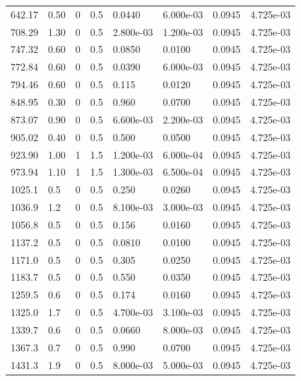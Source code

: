 \documentclass[preview]{standalone}
\begin{document}
{{\begin{tabular}{L{1.2cm}C{1.2cm} C{0.3cm}C{0.5cm} C{1.4cm}C{1.4cm} C{1.4cm}C{1.4cm}}
  642.17  &  0.50  & 0     & 0.5 &  0.0440  & 6.000e-03  & 0.0945 &  4.725e-03   \\ 
  708.29  &  1.30  & 0     & 0.5 &  2.800e-03  & 1.200e-03  & 0.0945 &  4.725e-03   \\ 
  747.32  &  0.60  & 0     & 0.5 &  0.0850  & 0.0100  & 0.0945 &  4.725e-03   \\ 
  772.84  &  0.60  & 0     & 0.5 &  0.0390  & 6.000e-03  & 0.0945 &  4.725e-03   \\ 
  794.46  &  0.60  & 0     & 0.5 &  0.115  & 0.0120  & 0.0945 &  4.725e-03   \\ 
  848.95  &  0.30  & 0     & 0.5 &  0.960  & 0.0700  & 0.0945 &  4.725e-03   \\ 
  873.07  &  0.90  & 0     & 0.5 &  6.600e-03  & 2.200e-03  & 0.0945 &  4.725e-03   \\ 
  905.02  &  0.40  & 0     & 0.5 &  0.500  & 0.0500  & 0.0945 &  4.725e-03   \\ 
  923.90  &  1.00  & 1     & 1.5 &  1.200e-03  & 6.000e-04  & 0.0945 &  4.725e-03   \\ 
  973.94  &  1.10  & 1     & 1.5 &  1.300e-03  & 6.500e-04  & 0.0945 &  4.725e-03   \\ 
  1025.1  &   0.5  & 0     & 0.5 &  0.250  & 0.0260  & 0.0945 &  4.725e-03   \\ 
  1036.9  &   1.2  & 0     & 0.5 &  8.100e-03  & 3.000e-03  & 0.0945 &  4.725e-03   \\ 
  1056.8  &   0.5  & 0     & 0.5 &  0.156  & 0.0160  & 0.0945 &  4.725e-03   \\ 
  1137.2  &   0.5  & 0     & 0.5 &  0.0810  & 0.0100  & 0.0945 &  4.725e-03   \\ 
  1171.0  &   0.5  & 0     & 0.5 &  0.305  & 0.0250  & 0.0945 &  4.725e-03   \\ 
  1183.7  &   0.5  & 0     & 0.5 &  0.550  & 0.0350  & 0.0945 &  4.725e-03   \\ 
  1259.5  &   0.6  & 0     & 0.5 &  0.174  & 0.0160  & 0.0945 &  4.725e-03   \\ 
  1325.0  &   1.7  & 0     & 0.5 &  4.700e-03  & 3.100e-03  & 0.0945 &  4.725e-03   \\ 
  1339.7  &   0.6  & 0     & 0.5 &  0.0660  & 8.000e-03  & 0.0945 &  4.725e-03   \\ 
  1367.3  &   0.7  & 0     & 0.5 &  0.990  & 0.0700  & 0.0945 &  4.725e-03   \\ 
  1431.3  &   1.9  & 0     & 0.5 &  8.000e-03  & 5.000e-03  & 0.0945 &  4.725e-03   \\ 

\end{tabular}}}
\end{document}
